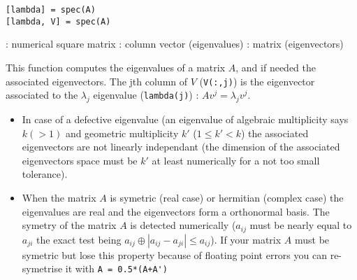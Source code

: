 
\begin{mandesc}
\end{mandesc}

\begin{calling_sequence}
\begin{verbatim}
[lambda] = spec(A)
[lambda, V] = spec(A)
\end{verbatim}
\end{calling_sequence}
\begin{parameters}
  \begin{varlist}
     :  numerical square matrix
     : column vector (eigenvalues)
     : matrix (eigenvectors)
  \end{varlist}
\end{parameters}

\begin{mandescription}
This function computes the eigenvalues of a matrix $A$, and if
needed the associated eigenvectors. The jth column of $V$ 
(\verb+V(:,j)+) is the eigenvector associated to the 
$\lambda_j$ eigenvalue (\verb+lambda(j)+) : $A v^j = \lambda_j v^j$.

\begin{itemize}
\item In case of a defective eigenvalue (an eigenvalue of
      algebraic multiplicity says $k (>1)$ and geometric multiplicity
      $k'$ ($1 \le k' < k$) the associated eigenvectors are not
      linearly independant (the dimension of the associated 
      eigenvectors space must be $k'$ at least numerically for
      a not too small tolerance).
\item When the matrix $A$ is symetric (real case) or hermitian
      (complex case) the eigenvalues are real and the eigenvectors 
      form a orthonormal basis. The symetry of the matrix $A$ is 
      detected numerically ($a_{ij}$ must be nearly equal to $a_{ji}$
      the exact test being $a_{ij} \oplus | a_{ij} - a_{ji}| \le a_{ij}$).
      If your matrix $A$ must be symetric but lose this property because
      of floating point errors you can re-symetrise it with \verb-A = 0.5*(A+A')-   
\end{itemize}

\end{mandescription}


